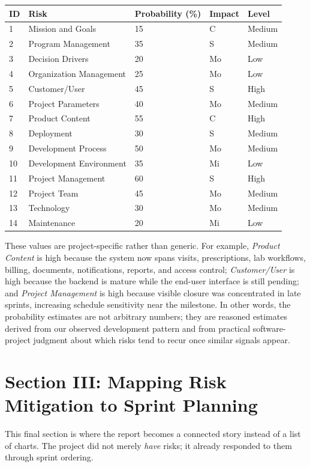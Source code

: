 \documentclass[11pt,a4paper]{article}
\begin{document}
\begin{center}
\begin{longtable}{|p{0.8cm}|p{4.9cm}|p{2.1cm}|p{1.4cm}|p{1.9cm}|}
\hline
\rowcolor{SoftBlue}
\textbf{ID} & \textbf{Risk} & \textbf{Probability (\%)} & \textbf{Impact} & \textbf{Level} \\
\hline
1 & Mission and Goals & 15 & C & Medium \\
\hline
2 & Program Management & 35 & S & Medium \\
\hline
3 & Decision Drivers & 20 & Mo & Low \\
\hline
4 & Organization Management & 25 & Mo & Low \\
\hline
5 & Customer/User & 45 & S & High \\
\hline
6 & Project Parameters & 40 & Mo & Medium \\
\hline
7 & Product Content & 55 & C & High \\
\hline
8 & Deployment & 30 & S & Medium \\
\hline
9 & Development Process & 50 & Mo & Medium \\
\hline
10 & Development Environment & 35 & Mi & Low \\
\hline
11 & Project Management & 60 & S & High \\
\hline
12 & Project Team & 45 & Mo & Medium \\
\hline
13 & Technology & 30 & Mo & Medium \\
\hline
14 & Maintenance & 20 & Mi & Low \\
\hline
\end{longtable}
\end{center}

These values are project-specific rather than generic. For example, \emph{Product Content} is high because the system now spans visits, prescriptions, lab workflows, billing, documents, notifications, reports, and access control; \emph{Customer/User} is high because the backend is mature while the end-user interface is still pending; and \emph{Project Management} is high because visible closure was concentrated in late sprints, increasing schedule sensitivity near the milestone. In other words, the probability estimates are not arbitrary numbers; they are reasoned estimates derived from our observed development pattern and from practical software-project judgment about which risks tend to recur once similar signals appear.

\section{Section III: Mapping Risk Mitigation to Sprint Planning}
This final section is where the report becomes a connected story instead of a list of charts. The project did not merely \emph{have} risks; it already responded to them through sprint ordering.
\end{document}
